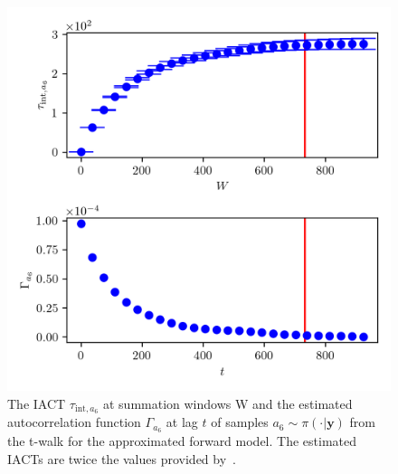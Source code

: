 \begin{figure}[ht!]
	\centering
	\includegraphics{UwerrTauIntTWalk17.png}
	\caption[IACT and autocorrelation function of samples $a_6 \sim \pi(\cdot|\bm{y})$, for approximated model.]{The IACT $\tau_{\text{int},a_6}$ at summation windows W and the estimated autocorrelation function $\Gamma_{a_6}$ at lag $t$ of samples $a_6 \sim \pi( \cdot| \bm{y})$ from the t-walk for the approximated forward model.
	The estimated IACTs are twice the values provided by~\cite{drikHesse, UwerrM}.}
	\label{fig:TWalkIATC18}
\end{figure}





